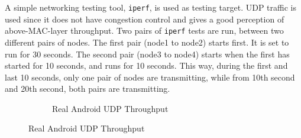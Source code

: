 \documentclass[12pt]{report}
\begin{document}
A simple networking testing tool, \texttt{iperf}, is used as testing target. UDP traffic is used since it does not have congestion control and gives a good perception of above-MAC-layer throughput. Two pairs of \texttt{iperf} tests are run, between two different pairs of nodes. The first pair (node1 to node2) starts first. It is set to run for 30 seconds. The second pair (node3 to node4) starts when the first has started for 10 seconds, and runs for 10 seconds. This way, during the first and last 10 seconds, only one pair of nodes are transmitting, while from 10th second and 20th second, both pairs are transmitting.

\begin{figure}[h]
  \begin{center}
    \begin{subfigure}[h]{\textwidth}
      \caption{\label{fig:squirrel_preliminary_android}Real Android UDP Throughput}

\end{subfigure}
\end{center}
\end{figure}
\end{document}
